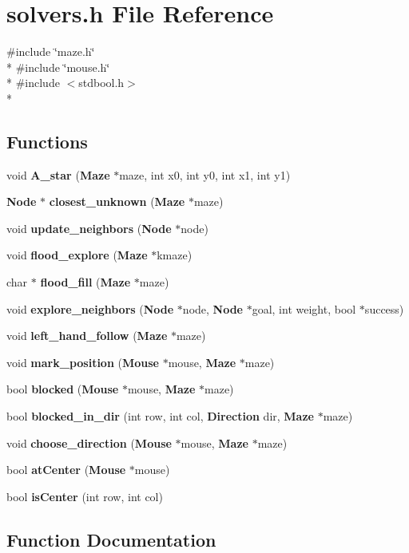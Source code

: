 \section{solvers.\-h File Reference}
\label{solvers_8h}
{\ttfamily \#include \char`\"{}maze.\-h\char`\"{}}\\*
{\ttfamily \#include \char`\"{}mouse.\-h\char`\"{}}\\*
{\ttfamily \#include $<$stdbool.\-h$>$}\\*
\subsection*{Functions}
\begin{DoxyCompactItemize}
\item 
void {\bf A\-\_\-star} ({\bf Maze} $\ast$maze, int x0, int y0, int x1, int y1)
\item 
{\bf Node} $\ast$ {\bf closest\-\_\-unknown} ({\bf Maze} $\ast$maze)
\item 
void {\bf update\-\_\-neighbors} ({\bf Node} $\ast$node)
\item 
void {\bf flood\-\_\-explore} ({\bf Maze} $\ast$kmaze)
\item 
char $\ast$ {\bf flood\-\_\-fill} ({\bf Maze} $\ast$maze)
\item 
void {\bf explore\-\_\-neighbors} ({\bf Node} $\ast$node, {\bf Node} $\ast$goal, int weight, bool $\ast$success)
\item 
void {\bf left\-\_\-hand\-\_\-follow} ({\bf Maze} $\ast$maze)
\item 
void {\bf mark\-\_\-position} ({\bf Mouse} $\ast$mouse, {\bf Maze} $\ast$maze)
\item 
bool {\bf blocked} ({\bf Mouse} $\ast$mouse, {\bf Maze} $\ast$maze)
\item 
bool {\bf blocked\-\_\-in\-\_\-dir} (int row, int col, {\bf Direction} dir, {\bf Maze} $\ast$maze)
\item 
void {\bf choose\-\_\-direction} ({\bf Mouse} $\ast$mouse, {\bf Maze} $\ast$maze)
\item 
bool {\bf at\-Center} ({\bf Mouse} $\ast$mouse)
\item 
bool {\bf is\-Center} (int row, int col)
\end{DoxyCompactItemize}


\subsection{Function Documentation}
